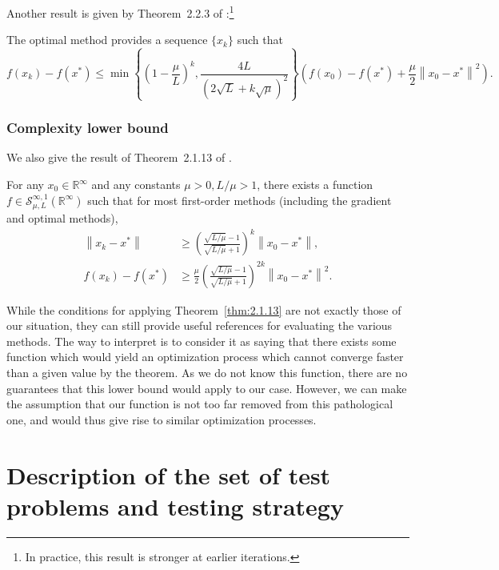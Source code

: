 \documentclass[final]{aomart}
\newcommand{\xk}{x_k}
\newcommand{\xopt}{x^*}
\newtheorem[{}\it]{thm}{Theorem}[section]
\theoremstyle{definition}
\newtheorem*[{}\it]{notation}{Notation}
\numberwithin{equation}{section}
\newcommand{\thmref}[1]{Theorem~\ref{#1}}
\newcommand{\enVert}[1]{\left\lVert#1\right\rVert}
\let\norm=\enVert
\newcommand{\sconvex}{\mathscr{S}}
\begin{document}
Another result is given by Theorem~2.2.3 of \cite{Nesterov2004}:\footnote{In practice, this result is stronger at earlier iterations.}
\begin{thm}
	\label{thm:2.2.3}
	The optimal method provides a sequence \(\{x_k\}\) such that
	\begin{equation}
	f(x_k) - f(x^*) \leqslant \min\left\{\left(1 - \frac{\mu}{L}\right)^k, \frac{4L}{(2\sqrt{L} + k \sqrt{\mu})^2}\right\} \left( f(x_0) - f(x^*) + \frac{\mu}{2} \norm{x_0 - x^*}^2 \right).
	\end{equation}
\end{thm}

\subsubsection{Complexity lower bound}
We also give the result of Theorem~2.1.13 of \cite{Nesterov2018}.
\begin{thm}
	\label{thm:2.1.13}
	For any \(x_0 \in \mathbb{R}^{\infty}\) and any constants \(\mu > 0, L/\mu > 1\), there exists a function \(f \in \sconvex_{\mu, L}^{\infty, 1}(\mathbb{R}^{\infty})\) such that for most first-order methods (including the gradient and optimal methods),
	\begin{align}
	\norm{\xk - \xopt} &\geqslant \left(\frac{\sqrt{L/\mu} - 1}{\sqrt{L/\mu} + 1}\right)^k \norm{x_0 - \xopt},\\
	f(\xk) - f(\xopt) &\geqslant \frac{\mu}{2} \left(\frac{\sqrt{L/\mu} - 1}{\sqrt{L/\mu} + 1}\right)^{2k} \norm{x_0 - \xopt}^2.
	\end{align}
\end{thm}
While the conditions for applying \thmref{thm:2.1.13} are not exactly those of our situation, they can still provide useful references for evaluating the various methods.
The way to interpret is to consider it as saying that there exists some function which would yield an optimization process which cannot converge faster than a given value by the theorem.
As we do not know this function, there are no guarantees that this lower bound would apply to our case. However, we can make the assumption that our function is not too far removed from this pathological one, and would thus give rise to similar optimization processes.

\section{Description of the set of test problems and testing strategy}
\label{sec:desc_test}
\end{document}
